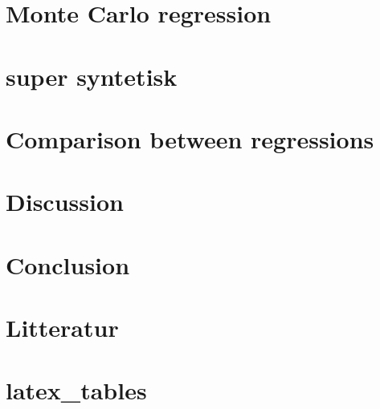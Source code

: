 \documentclass{article}
\begin{document}
	\section{Monte Carlo regression}
	\newpage
	
	
	
	
		\section{super syntetisk}
	
	\newpage
	
	\section{Comparison between regressions}
	\newpage
	
	\section{Discussion}
	\newpage
	
	\section{Conclusion}
	\newpage
	
 	\section{Litteratur}
 	
 	\section{latex_tables}
 	\newpage
  
\end{document}
